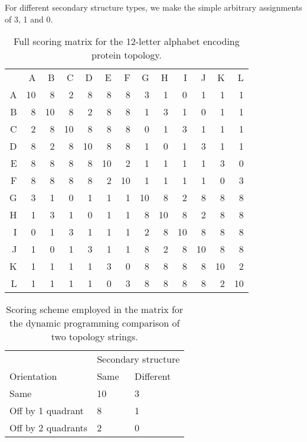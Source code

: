 \documentclass{article}
\begin{document}
For different secondary structure types, we make the simple arbitrary
assignments of 3, 1 and 0.


\begin{table}
\begin{center}
\begin{tabular}{rrrrrrrrrrrrr}
  & A & B & C & D & E & F & G & H & I & J & K & L \\
A &10 & 8 & 2 & 8 & 8 & 8 & 3 & 1 & 0 & 1 & 1 & 1 \\
B & 8 &10 & 8 & 2 & 8 & 8 & 1 & 3 & 1 & 0 & 1 & 1 \\
C & 2 & 8 &10 & 8 & 8 & 8 & 0 & 1 & 3 & 1 & 1 & 1 \\
D & 8 & 2 & 8 &10 & 8 & 8 & 1 & 0 & 1 & 3 & 1 & 1 \\
E & 8 & 8 & 8 & 8 &10 & 2 & 1 & 1 & 1 & 1 & 3 & 0 \\
F & 8 & 8 & 8 & 8 & 2 &10 & 1 & 1 & 1 & 1 & 0 & 3 \\
G & 3 & 1 & 0 & 1 & 1 & 1 &10 & 8 & 2 & 8 & 8 & 8 \\
H & 1 & 3 & 1 & 0 & 1 & 1 & 8 &10 & 8 & 2 & 8 & 8 \\
I & 0 & 1 & 3 & 1 & 1 & 1 & 2 & 8 &10 & 8 & 8 & 8 \\
J & 1 & 0 & 1 & 3 & 1 & 1 & 8 & 2 & 8 &10 & 8 & 8 \\
K & 1 & 1 & 1 & 1 & 3 & 0 & 8 & 8 & 8 & 8 &10 & 2 \\
L & 1 & 1 & 1 & 1 & 0 & 3 & 8 & 8 & 8 & 8 & 2 &10 \\
\end{tabular}
\end{center}
\caption{\label{tab:fullmatrix} Full scoring matrix for the 12-letter
alphabet encoding protein topology.}
\end{table}

\begin{table}
\begin{center}
\begin{tabular}{lll}\hline
                        & \multicolumn{2}{c}{Secondary structure} \\ \cline{2-3}
Orientation             & Same  & Different     \\ \hline
Same                    & 10    & 3             \\
Off by 1 quadrant       & 8     & 1             \\
Off by 2 quadrants      & 2     & 0             \\ \hline
\end{tabular}
\end{center}
\caption{\label{tab:matrix} Scoring scheme employed in the matrix for
the dynamic programming comparison of two topology strings.}
\end{table}
\end{document}
